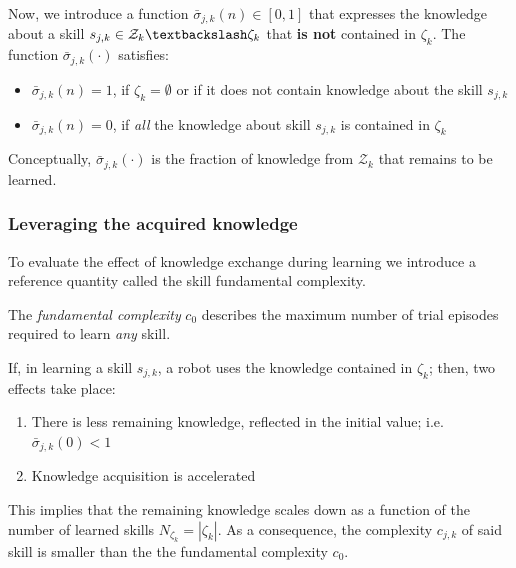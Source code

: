 Now, we introduce a function $\bar{\sigma}_{j,k}\left(n\right)\in [0,1]$ that expresses the knowledge about a skill $s_{j,k} \in \mathcal{Z}_k\textbackslash \mathcal{\zeta}_k$ that \textbf{is not} contained in $\mathcal{\zeta}_k$. The function $\bar{\sigma}_{j,k}(\cdot)$ satisfies:
\begin{itemize}
	\item $\bar{\sigma}_{j,k}\left(n\right) = 1$, if $\mathcal{\zeta}_k=\emptyset$ or if it does not contain knowledge about the skill $s_{j,k}$
	\item $\bar{\sigma}_{j,k}\left(n\right) = 0$, if \emph{all} the knowledge about skill $s_{j,k}$ is contained in $\mathcal{\zeta}_k$
\end{itemize} 
Conceptually, $\bar{\sigma}_ {j,k}\left(\cdot\right)$ is the fraction of knowledge from ${\mathcal{Z}_k}$ that remains to be learned.

\subsubsection{\textbf{Leveraging the acquired knowledge}}
To evaluate the effect of knowledge exchange during learning we introduce a reference quantity called the skill fundamental complexity.
\begin{tcolorbox}
	\begin{definition}\label{assumption:fundamental_complexity}
		The \emph{fundamental complexity} $c_0$ describes the maximum number of trial episodes required to learn \emph{any} skill.
	\end{definition}
\end{tcolorbox}
If, in learning a skill $ s_{j,k} $, a robot uses the knowledge contained in $\mathcal{\zeta}_k$; then, two effects take place:
\begin{enumerate}
	\item There is less remaining knowledge, reflected in the initial value; i.e. $\bar{\sigma}_{j,k}(0) < 1$
	\item Knowledge acquisition is accelerated
\end{enumerate}
This implies that the remaining knowledge scales down as a function of the number of learned skills $N_{\zeta_k}=|\mathcal{\zeta}_k|$. As a consequence, the complexity $c_{j,k}$ of said skill is smaller than the the fundamental complexity $c_0$.%

